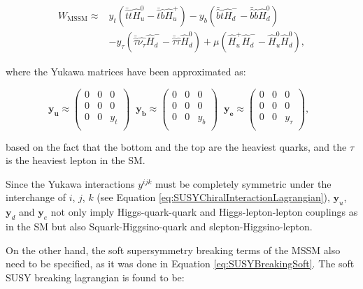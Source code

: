 \begin{equation}
\begin{split}
W_\text{MSSM} \approx & y_t(\bar{\hat{t}}\hat{t}\hat{H}^0_u - \bar{\hat{t}}\hat{b}\hat{H}^+_u)
- y_b(\bar{\hat{b}}\hat{t}\hat{H}^-_d - \bar{\hat{b}}\hat{b}\hat{H}^0_d) \\
& - y_\tau(\bar{\hat{\tau}}\hat{\nu_\tau}\hat{H}^-_d - \bar{\hat{\tau}}\hat{\tau}\hat{H}^0_d)
+ \mu(\hat{H}^+_u \hat{H}^-_d - \hat{H}^0_u \hat{H}^0_d),
\end{split}
\label{eq:SUSYMSSMSuperPotentialAprrox}
\end{equation}

\noindent where the Yukawa matrices have been approximated as:

\begin{equation}
\mathbf{y_u} \approx \left(
\begin{matrix}
0 & 0 & 0 \\
0 & 0 & 0 \\
0 & 0 & y_t \\
\end{matrix}
\right) \;\;
\mathbf{y_b} \approx \left(
\begin{matrix}
0 & 0 & 0 \\
0 & 0 & 0 \\
0 & 0 & y_b \\
\end{matrix}
\right) \;\;
\mathbf{y_e} \approx \left(
\begin{matrix}
0 & 0 & 0 \\
0 & 0 & 0 \\
0 & 0 & y_\tau \\
\end{matrix}
\right), \;\;
\label{eq:SUSYMSSMYukawaApproximation}
\end{equation}

\noindent based on the fact that the bottom and the top are the heaviest quarks, and the $\tau$ is the heaviest lepton in the SM.

Since the Yukawa interactions $y^{ijk}$ must be completely symmetric under the interchange of $i$, $j$, $k$ (see Equation \ref{eq:SUSYChiralInteractionLagrangian}), $\mathbf{y}_u$, $\mathbf{y}_d$ and $\mathbf{y}_e$ not only imply Higgs-quark-quark and Higgs-lepton-lepton couplings as in the SM but also Squark-Higgsino-quark and slepton-Higgsino-lepton.

On the other hand, the soft supersymmetry breaking terms of the MSSM also need to be specified, as it was done in Equation \ref{eq:SUSYBreakingSoft}.
The soft SUSY breaking lagrangian is found to be:

